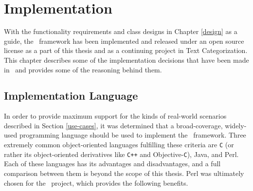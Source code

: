 \chapter{Implementation}
\label{Implementation}

With the functionality requirements and class designs in Chapter
\ref{design} as a guide, the \aicat\ framework has been implemented
and released under an open source license\cite{raymond:97,dibona:99} as a
part of this thesis and as a continuing project in Text
Categorization.  This chapter describes some of the implementation
decisions that have been made in \aicat\, and provides some of the
reasoning behind them.

\section{Implementation Language}
\label{imp-language}

In order to provide maximum support for the kinds of real-world
scenarios described in Section \ref{use-cases}, it was determined that
a broad-coverage, widely-used programming language should be used to
implement the \aicat\ framework.  Three extremely common
object-oriented languages fulfilling these criteria are \texttt{C} (or
rather its object-oriented derivatives like \texttt{C++} and
Objective-\texttt{C}), Java, and Perl.  Each of these languages has
its advantages and disadvantages, and a full comparison between them
is beyond the scope of this thesis.  Perl was ultimately chosen for
the \aicat\ project, which provides the following benefits.

